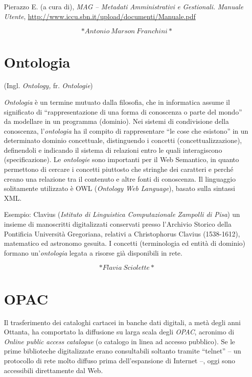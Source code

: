 \documentclass[
  b5paper,
  twoside,
  12pt,
  chapterprefix=false,
  bibliography=totocnumbered,
  parskip=false]{scrbook}
\begin{document}
Pierazzo E. (a cura di), \emph{MAG -- Metadati Amministrativi e Gestionali.
Manuale Utente},
\url{http://www.iccu.sbn.it/upload/documenti/Manuale.pdf}

\[*Antonio~Marson~Franchini*\]

\hypertarget{ontologia}{%
\chapter{Ontologia}\label{ontologia}}

(Ingl. \emph{Ontology,} fr. \emph{Ontologie})

\emph{Ontologia} è un termine mutuato dalla filosofia, che in informatica
assume il significato di \enquote{rappresentazione di una forma di conoscenza o
parte del mondo} da modellare in un programma (dominio). Nei sistemi di
condivisione della conoscenza, l'\emph{ontologia} ha il compito di
rappresentare \enquote{le cose che esistono} in un determinato dominio
concettuale, distinguendo i concetti (concettualizzazione), definendoli
e indicando il sistema di relazioni entro le quali interagiscono
(specificazione). Le \emph{ontologie} sono importanti per il Web Semantico,
in quanto permettono di cercare i concetti piuttosto che stringhe dei
caratteri e perché creano una relazione tra il contenuto e altre fonti
di conoscenza. Il linguaggio solitamente utilizzato è OWL (\emph{Ontology Web
Language}), basato sulla sintassi XML.

Esempio: Clavius (\emph{Istituto di Linguistica Computazionale Zampolli di
Pisa}) un insieme di manoscritti digitalizzati conservati presso
l'Archivio Storico della Pontificia Università Gregoriana, relativi a
Christophorus Clavius (1538-1612), matematico ed astronomo gesuita. I
concetti (terminologia ed entità di dominio) formano un'\emph{ontologia}
legata a risorse già disponibili in rete.

\[*Flavia~Sciolette*\]

\hypertarget{opac}{%
\chapter{OPAC}\label{opac}}

Il trasferimento dei cataloghi cartacei in banche dati digitali, a metà
degli anni Ottanta, ha comportato la diffusione su larga scala degli
\emph{OPAC}, acronimo di \emph{Online public access catalogue} (o catalogo in
linea ad accesso pubblico). Se le prime biblioteche digitalizzate erano
consultabili soltanto tramite \enquote{telnet} -- un protocollo di rete molto
diffuso prima dell'espansione di Internet --, oggi sono accessibili
direttamente dal Web.
\end{document}
